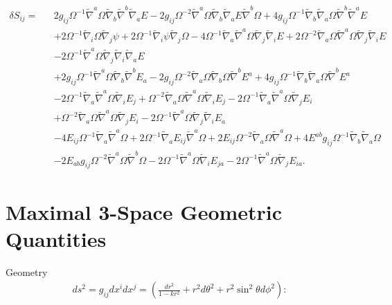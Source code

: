 \documentclass[10pt,letterpaper]{article}
\numberwithin{equation}{section}
\begin{document}
\begin{appendices}
\begin{eqnarray}
\delta S_{ij}=&&2 g_{ij} \Omega^{-1} \tilde{\nabla}^{a}\Omega \tilde{\nabla}_{b}\tilde{\nabla}^{b}\tilde{\nabla}_{a}E
 - 2 g_{ij} \Omega^{-2} \tilde{\nabla}^{a}\Omega \tilde{\nabla}_{b}\tilde{\nabla}_{a}E \tilde{\nabla}^{b}\Omega
 + 4 g_{ij} \Omega^{-1} \tilde{\nabla}_{b}\tilde{\nabla}_{a}\Omega \tilde{\nabla}^{b}\tilde{\nabla}^{a}E
\nonumber\\
&& + 2 \Omega^{-1} \tilde{\nabla}_{i}\Omega \tilde{\nabla}_{j}\psi
 + 2 \Omega^{-1} \tilde{\nabla}_{i}\psi \tilde{\nabla}_{j}\Omega
 - 4 \Omega^{-1} \tilde{\nabla}_{a}\tilde{\nabla}^{a}\Omega \tilde{\nabla}_{j}\tilde{\nabla}_{i}E
 + 2 \Omega^{-2} \tilde{\nabla}_{a}\Omega \tilde{\nabla}^{a}\Omega \tilde{\nabla}_{j}\tilde{\nabla}_{i}E
\nonumber\\
&& - 2 \Omega^{-1} \tilde{\nabla}^{a}\Omega \tilde{\nabla}_{j}\tilde{\nabla}_{i}\tilde{\nabla}_{a}E
\nonumber\\
&&+2 g_{ij} \Omega^{-1} \tilde{\nabla}^{a}\Omega \tilde{\nabla}_{b}\tilde{\nabla}^{b}E_{a}
 - 2 g_{ij} \Omega^{-2} \tilde{\nabla}_{a}\Omega \tilde{\nabla}_{b}\Omega \tilde{\nabla}^{b}E^{a}
 + 4 g_{ij} \Omega^{-1} \tilde{\nabla}_{b}\tilde{\nabla}_{a}\Omega \tilde{\nabla}^{b}E^{a}
\nonumber\\
&& - 2 \Omega^{-1} \tilde{\nabla}_{a}\tilde{\nabla}^{a}\Omega \tilde{\nabla}_{i}E_{j}
 + \Omega^{-2} \tilde{\nabla}_{a}\Omega \tilde{\nabla}^{a}\Omega \tilde{\nabla}_{i}E_{j}
 - 2 \Omega^{-1} \tilde{\nabla}_{a}\tilde{\nabla}^{a}\Omega \tilde{\nabla}_{j}E_{i}
\nonumber\\
&& + \Omega^{-2} \tilde{\nabla}_{a}\Omega \tilde{\nabla}^{a}\Omega \tilde{\nabla}_{j}E_{i}
 - 2 \Omega^{-1} \tilde{\nabla}^{a}\Omega \tilde{\nabla}_{j}\tilde{\nabla}_{i}E_{a}
\nonumber\\
&&-4 E_{ij} \Omega^{-1} \tilde{\nabla}_{a}\tilde{\nabla}^{a}\Omega
 + 2 \Omega^{-1} \tilde{\nabla}_{a}E_{ij} \tilde{\nabla}^{a}\Omega
 + 2 E_{ij} \Omega^{-2} \tilde{\nabla}_{a}\Omega \tilde{\nabla}^{a}\Omega
 + 4 E^{ab} g_{ij} \Omega^{-1} \tilde{\nabla}_{b}\tilde{\nabla}_{a}\Omega\nonumber\\
&& - 2 E_{ab} g_{ij} \Omega^{-2} \tilde{\nabla}^{a}\Omega \tilde{\nabla}^{b}\Omega
 - 2 \Omega^{-1} \tilde{\nabla}^{a}\Omega \tilde{\nabla}_{i}E_{ja}
 - 2 \Omega^{-1} \tilde{\nabla}^{a}\Omega \tilde{\nabla}_{j}E_{ia}.
\label{dSsvt}
\end{eqnarray}

\section{Maximal 3-Space Geometric Quantities}
Geometry
\begin{eqnarray}
ds^2 = g_{ij}dx^idx^j = \left( \frac{dr^2}{1-kr^2} + r^2 d\theta^2 + r^2\sin^2\theta d\phi^2\right):
\end{eqnarray}


\end{appendices}
\end{document}
